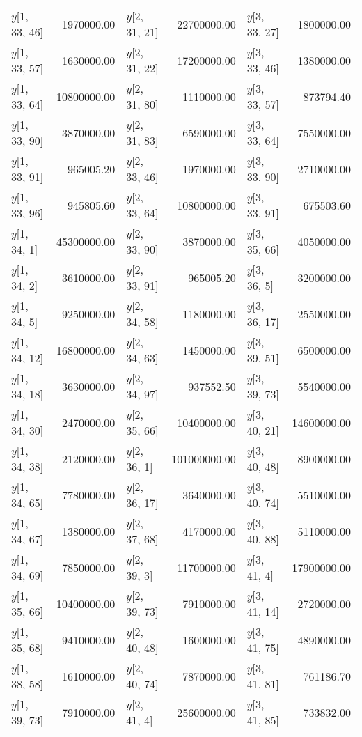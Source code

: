 \begin{longtable}{lrlrlr}
$y$[1, 33, 46] & 1970000.00 & $y$[2, 31, 21] & 22700000.00 & $y$[3, 33, 27] & 1800000.00 \\
$y$[1, 33, 57] & 1630000.00 & $y$[2, 31, 22] & 17200000.00 & $y$[3, 33, 46] & 1380000.00 \\
$y$[1, 33, 64] & 10800000.00 & $y$[2, 31, 80] & 1110000.00 & $y$[3, 33, 57] & 873794.40 \\
$y$[1, 33, 90] & 3870000.00 & $y$[2, 31, 83] & 6590000.00 & $y$[3, 33, 64] & 7550000.00 \\
$y$[1, 33, 91] & 965005.20 & $y$[2, 33, 46] & 1970000.00 & $y$[3, 33, 90] & 2710000.00 \\
$y$[1, 33, 96] & 945805.60 & $y$[2, 33, 64] & 10800000.00 & $y$[3, 33, 91] & 675503.60 \\
$y$[1, 34, 1] & 45300000.00 & $y$[2, 33, 90] & 3870000.00 & $y$[3, 35, 66] & 4050000.00 \\
$y$[1, 34, 2] & 3610000.00 & $y$[2, 33, 91] & 965005.20 & $y$[3, 36, 5] & 3200000.00 \\
$y$[1, 34, 5] & 9250000.00 & $y$[2, 34, 58] & 1180000.00 & $y$[3, 36, 17] & 2550000.00 \\
$y$[1, 34, 12] & 16800000.00 & $y$[2, 34, 63] & 1450000.00 & $y$[3, 39, 51] & 6500000.00 \\
$y$[1, 34, 18] & 3630000.00 & $y$[2, 34, 97] & 937552.50 & $y$[3, 39, 73] & 5540000.00 \\
$y$[1, 34, 30] & 2470000.00 & $y$[2, 35, 66] & 10400000.00 & $y$[3, 40, 21] & 14600000.00 \\
$y$[1, 34, 38] & 2120000.00 & $y$[2, 36, 1] & 101000000.00 & $y$[3, 40, 48] & 8900000.00 \\
$y$[1, 34, 65] & 7780000.00 & $y$[2, 36, 17] & 3640000.00 & $y$[3, 40, 74] & 5510000.00 \\
$y$[1, 34, 67] & 1380000.00 & $y$[2, 37, 68] & 4170000.00 & $y$[3, 40, 88] & 5110000.00 \\
$y$[1, 34, 69] & 7850000.00 & $y$[2, 39, 3] & 11700000.00 & $y$[3, 41, 4] & 17900000.00 \\
$y$[1, 35, 66] & 10400000.00 & $y$[2, 39, 73] & 7910000.00 & $y$[3, 41, 14] & 2720000.00 \\
$y$[1, 35, 68] & 9410000.00 & $y$[2, 40, 48] & 1600000.00 & $y$[3, 41, 75] & 4890000.00 \\
$y$[1, 38, 58] & 1610000.00 & $y$[2, 40, 74] & 7870000.00 & $y$[3, 41, 81] & 761186.70 \\
$y$[1, 39, 73] & 7910000.00 & $y$[2, 41, 4] & 25600000.00 & $y$[3, 41, 85] & 733832.00 \\

\end{longtable}
